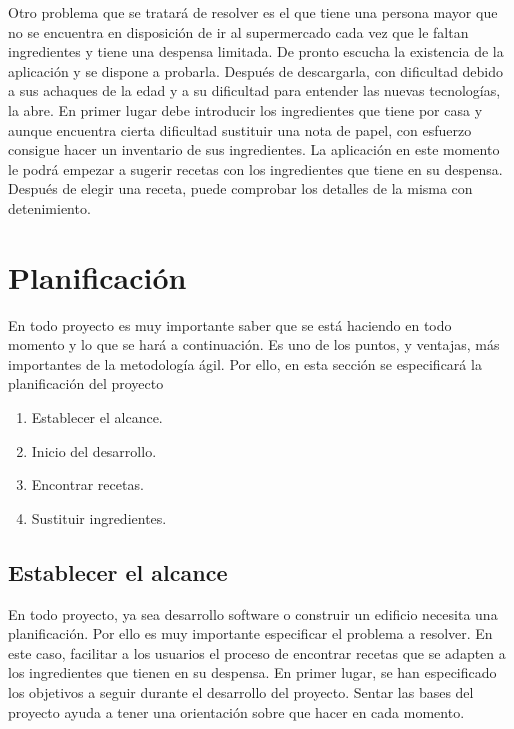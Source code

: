 Otro problema que se tratará de resolver es el que tiene una persona mayor que no se encuentra en disposición de ir al supermercado cada vez que le faltan ingredientes y tiene una despensa limitada. De pronto escucha la existencia de la aplicación y se dispone a probarla. Después de descargarla, con dificultad debido a sus achaques de la edad y a su dificultad para entender las nuevas tecnologías, la abre. En primer lugar debe introducir los ingredientes que tiene por casa y aunque encuentra cierta dificultad sustituir una nota de papel, con esfuerzo consigue hacer un inventario de sus ingredientes. La aplicación en este momento le podrá empezar a sugerir recetas con los ingredientes que tiene en su despensa. Después de elegir una receta, puede comprobar los detalles de la misma con detenimiento.

\section{Planificación}
En todo proyecto es muy importante saber que se está haciendo en todo momento y lo que se hará a continuación. Es uno de los puntos, y ventajas, más importantes de la metodología ágil. Por ello, en esta sección se especificará la planificación del proyecto\:
\begin{enumerate}
    \item Establecer el alcance.
    \item Inicio del desarrollo.
    \item Encontrar recetas.
    \item Sustituir ingredientes.
\end{enumerate}

\subsection{Establecer el alcance}
En todo proyecto, ya sea desarrollo software o construir un edificio necesita una planificación. Por ello es muy importante especificar el problema a resolver. En este caso, facilitar a los usuarios el proceso de encontrar recetas que se adapten a los ingredientes que tienen en su despensa. En primer lugar, se han especificado los objetivos a seguir durante el desarrollo del proyecto. Sentar las bases del proyecto ayuda a tener una orientación sobre que hacer en cada momento. 

